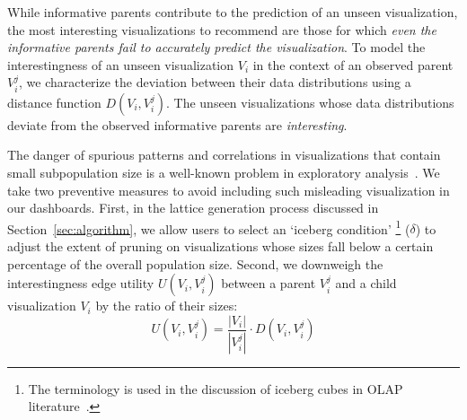  While informative parents contribute to the prediction of an unseen visualization, the most interesting visualizations to recommend are those for which \emph{even the informative parents fail to accurately predict the visualization}.  To model the interestingness of an unseen visualization $V_i$ in the context of an observed parent $V_i^j$, we characterize the deviation between their data distributions using a distance function $D(V_i, V_i^j)$. The unseen visualizations whose data distributions deviate from the observed informative parents are \emph{interesting}.  

 The danger of spurious patterns and correlations in visualizations that contain small subpopulation size is a well-known problem in exploratory analysis~\cite{Binnig2017}. We take two preventive measures to avoid including such misleading visualization in our dashboards. First, in the lattice generation process discussed in Section~\ref{sec:algorithm}, we allow users to select an `iceberg condition' \footnote{The terminology is used in the discussion of iceberg cubes in OLAP literature~\cite{Xin2007}.} ($\delta$) to adjust the extent of pruning on visualizations whose sizes fall below a certain percentage of the overall population size. Second, we downweigh the interestingness edge utility $U(V_i, V_i^j)$ between a parent $V_i^j$ and a child visualization $V_i$ by the ratio of their sizes:
\begin{equation}
    U(V_i, V_i^j) = \frac{|V_i|}{|V_i^{j}|} \cdot D(V_i, V_i^j)
    \label{edge_utility}
\end{equation}
